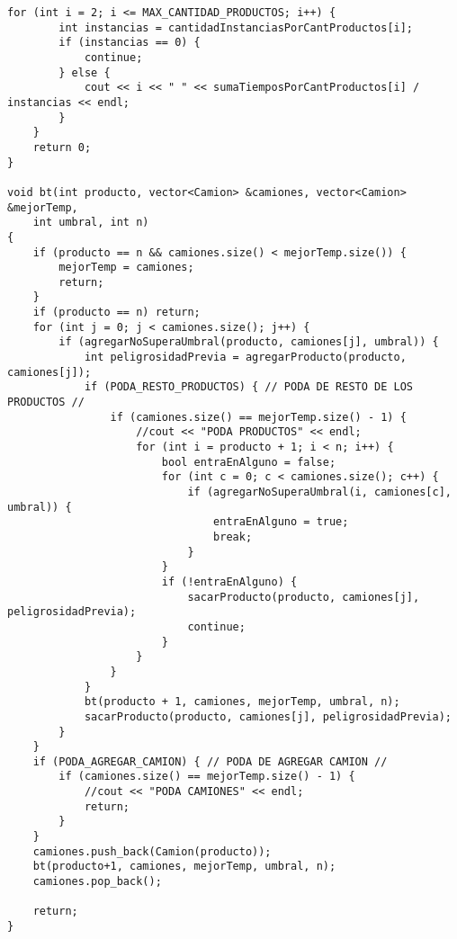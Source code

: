 \begin{lstlisting}[frame=single]
    for (int i = 2; i <= MAX_CANTIDAD_PRODUCTOS; i++) {
        int instancias = cantidadInstanciasPorCantProductos[i];
        if (instancias == 0) {
            continue;
        } else {
            cout << i << " " << sumaTiemposPorCantProductos[i] / instancias << endl;
        }
    }
    return 0;
}

void bt(int producto, vector<Camion> &camiones, vector<Camion> &mejorTemp,
    int umbral, int n)
{
    if (producto == n && camiones.size() < mejorTemp.size()) {
        mejorTemp = camiones;
        return;
    }
    if (producto == n) return;
    for (int j = 0; j < camiones.size(); j++) {
        if (agregarNoSuperaUmbral(producto, camiones[j], umbral)) {
            int peligrosidadPrevia = agregarProducto(producto, camiones[j]);
            if (PODA_RESTO_PRODUCTOS) { // PODA DE RESTO DE LOS PRODUCTOS //
                if (camiones.size() == mejorTemp.size() - 1) {
                    //cout << "PODA PRODUCTOS" << endl;
                    for (int i = producto + 1; i < n; i++) {
                        bool entraEnAlguno = false;
                        for (int c = 0; c < camiones.size(); c++) {
                            if (agregarNoSuperaUmbral(i, camiones[c], umbral)) {
                                entraEnAlguno = true;
                                break;
                            }
                        }
                        if (!entraEnAlguno) {
                            sacarProducto(producto, camiones[j], peligrosidadPrevia);
                            continue;
                        }
                    }
                }
            }
            bt(producto + 1, camiones, mejorTemp, umbral, n);
            sacarProducto(producto, camiones[j], peligrosidadPrevia);
        }
    }
    if (PODA_AGREGAR_CAMION) { // PODA DE AGREGAR CAMION //
        if (camiones.size() == mejorTemp.size() - 1) {
            //cout << "PODA CAMIONES" << endl;
            return;
        }
    }
    camiones.push_back(Camion(producto));
    bt(producto+1, camiones, mejorTemp, umbral, n);
    camiones.pop_back();

    return;
}
\end{lstlisting}
